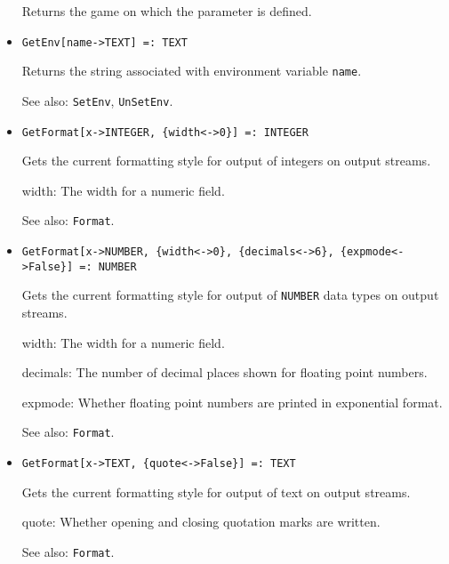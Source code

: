 \begin{itemize}
\bd
Returns the game on which the parameter is defined.
\ed

\item{}
\protect \large \begin{verbatim}
GetEnv[name->TEXT] =: TEXT 
\end{verbatim} \normalsize

\bd
Returns the string associated with environment variable \verb+name+.
\item [See also:] \verb+SetEnv+, \verb+UnSetEnv+.
\ed


\item{}
\protect \large \begin{verbatim}
GetFormat[x->INTEGER, {width<->0}] =: INTEGER 
\end{verbatim} \normalsize

\bd 
Gets the current formatting style for output of integers on
output streams.
\bd
\item [width:] The width for a numeric field.  
\ed
\item [See also:] \verb+Format+.
\ed


\item{}
\protect \large \begin{verbatim}
GetFormat[x->NUMBER, {width<->0}, {decimals<->6}, {expmode<->False}] =: NUMBER 
\end{verbatim} \normalsize

\bd Gets the current formatting style for output of {\tt NUMBER} data types
on output streams.  
\bd
\item [width:] The width for a numeric field.  
\item [decimals:] The number of decimal places shown for floating point
numbers.
\item [expmode:] Whether floating point numbers are printed in
exponential format.
\ed
\item [See also:] \verb+Format+.
\ed

\item{}
\protect \large \begin{verbatim}
GetFormat[x->TEXT, {quote<->False}] =: TEXT 
\end{verbatim} \normalsize

\bd
Gets the current formatting style for output of text on output streams.
\bd
\item [quote:] Whether opening and closing quotation marks are
written. 
\ed
\item [See also:] \verb+Format+.
\ed



\end{itemize}
